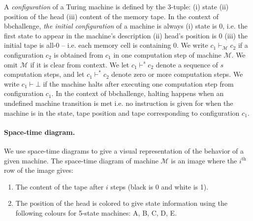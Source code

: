 \documentclass[a4paper,british]{article}
\begin{document}
A \textit{configuration} of a Turing machine is defined by the 3-tuple: (i) state (ii) position of the head (iii) content of the memory tape. In the context of bbchallenge, \textit{the initial configuration} of a machine is always (i) state is 0, i.e. the first state to appear in the machine's description (ii) head's position is 0 (iii) the initial tape is all-0 -- i.e. each memory cell is containing 0. We write $c_1 \vdash_\mathcal{M} c_2$ if a configuration $c_2$ is obtained from $c_1$ in one computation step of machine $\mathcal{M}$. We omit $\mathcal{M}$ if it is clear from context. We let $c_1 \vdash^s c_2$ denote a sequence of $s$ computation steps, and let  $c_1 \vdash^* c_2$ denote zero or more computation steps. %
We write $c_1 \vdash \bot$ if the machine halts after executing one computation step from configuration $c_1$. In the context of bbchallenge, halting happens when an undefined machine transition  is met i.e. no instruction is given for when the machine is in the state, tape position and tape corresponding to configuration $c_1$.

\paragraph*{Space-time diagram.} We use space-time diagrams to give a visual representation of the behavior of a given machine. The space-time diagram of machine $\mathcal{M}$ is an image where the $i^\text{th}$ row of the image gives:
\begin{enumerate}
  \item The content of the tape after $i$ steps (black is 0 and white is 1).
  \item The position of the head is colored to give state information using the following colours for 5-state machines: \textcolor{colorA}{A},  \textcolor{colorB}{B},  \textcolor{colorC}{C},  \textcolor{colorD}{D},  \textcolor{colorE}{E}.
\end{enumerate}








\end{document}
